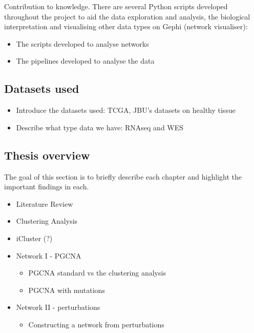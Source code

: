 Contribution to knowledge. There are several Python scripts developed throughout the project to aid the data exploration and analysis, the biological interpretation and visualising other data types on Gephi (network visualiser):
\begin{itemize}
    \item The scripts developed to analyse networks
    \item The pipelines developed to analyse the data
\end{itemize}


\subsection{Datasets used} 

\begin{itemize}
    \item Introduce the datasets used: TCGA, JBU's datasets on healthy tissue
    \item Describe what type data we have: RNAseq and WES
\end{itemize}


\subsection{Thesis overview } 


The goal of this section is to briefly describe each chapter and highlight the important findings in each.

\begin{itemize}
    \item Literature Review
    \item Clustering Analysis
    \item iCluster (?)
    \item Network I - PGCNA
    \begin{itemize}
        \item PGCNA standard vs the clustering analysis
        \item PGCNA with mutations
    \end{itemize}
    \item Network II - perturbations
    \begin{itemize}
        \item Constructing a network from perturbations
    \end{itemize}
\end{itemize}